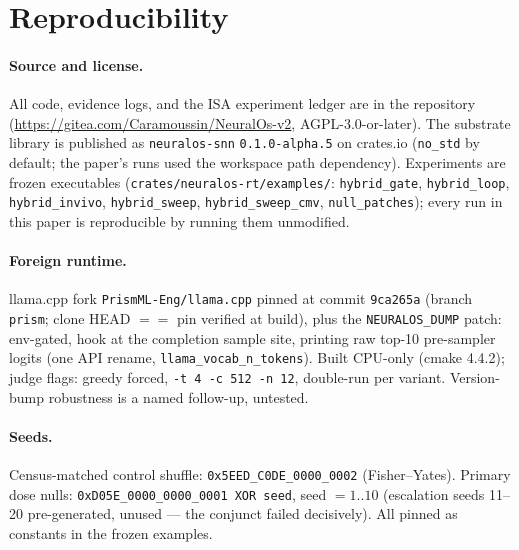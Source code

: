 \section{Reproducibility}
\label{app:repro}

\paragraph{Source and license.} All code, evidence logs, and the ISA
experiment ledger are in the repository
(\url{https://gitea.com/Caramoussin/NeuralOs-v2}, AGPL-3.0-or-later).
The substrate library is published as \texttt{neuralos-snn}
\texttt{0.1.0-alpha.5} on crates.io (\texttt{no\_std} by default;
the paper's runs used the workspace path dependency). Experiments are
frozen executables (\texttt{crates/neuralos-rt/examples/}:
\texttt{hybrid\_gate}, \texttt{hybrid\_loop}, \texttt{hybrid\_invivo},
\texttt{hybrid\_sweep}, \texttt{hybrid\_sweep\_cmv},
\texttt{null\_patches}); every run in this paper is reproducible by
running them unmodified.

\paragraph{Foreign runtime.} llama.cpp fork
\texttt{PrismML-Eng/llama.cpp} pinned at commit \texttt{9ca265a}
(branch \texttt{prism}; clone HEAD $==$ pin verified at build), plus
the \texttt{NEURALOS\_DUMP} patch: env-gated, hook at the completion
sample site, printing raw top-10 pre-sampler logits (one API rename,
\texttt{llama\_}\allowbreak\texttt{vocab\_}\allowbreak\texttt{n\_tokens}). Built CPU-only (cmake 4.4.2);
judge flags: greedy forced, \texttt{-t 4 -c 512 -n 12}, double-run
per variant. Version-bump robustness is a named follow-up, untested.

\paragraph{Seeds.} Census-matched control shuffle:
\texttt{0x5EED\_C0DE\_0000\_0002} (Fisher--Yates). Primary dose
nulls: \texttt{0xD05E\_0000\_0000\_0001 XOR seed}, seed $= 1..10$
(escalation seeds 11--20 pre-generated, unused --- the conjunct
failed decisively). All pinned as constants in the frozen examples.


